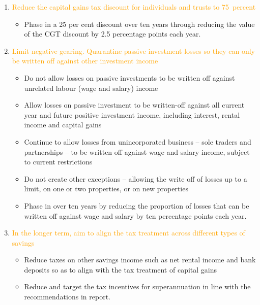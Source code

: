 \begin{recommendations}[-35pt]
\raggedright
\begin{enumerate}
\item \textcolor{Orange}{Reduce the capital gains tax discount for individuals and trusts to 75~percent} 
\begin{itemize}
  \item Phase in a 25 per cent discount over ten years through reducing the value of the CGT discount by 2.5 percentage points each year.
\end{itemize}
\item \textcolor{Orange}{Limit negative gearing. Quarantine passive investment losses so they can only be written off against other investment income}
\begin{itemize}
  \item 	Do not allow losses on passive investments to be written off against unrelated labour (wage and salary) income 
\item 	Allow losses on passive investment to be written-off against all current year and future positive investment income, including interest, rental income and capital gains 
\item 	Continue to allow losses from unincorporated business -- sole traders and partnerships -- to be written off against wage and salary income, subject to current restrictions
\item 	Do not create other exceptions -- allowing the write off of losses up to a limit, on one or two properties, or on new properties
\item 	Phase in over ten years by reducing the proportion of losses that can be written off against wage and salary by ten percentage points each year.
\end{itemize}

\item \textcolor{Orange}{In the longer term, aim to align the tax treatment across different types of savings}
\begin{itemize}
\item	Reduce taxes on other savings income such as net rental income and bank deposits so as to align with the tax treatment of capital gains
\item	Reduce and target the tax incentives for superannuation in line with the recommendations in  report.
\end{itemize}
\end{enumerate}

\end{recommendations}
